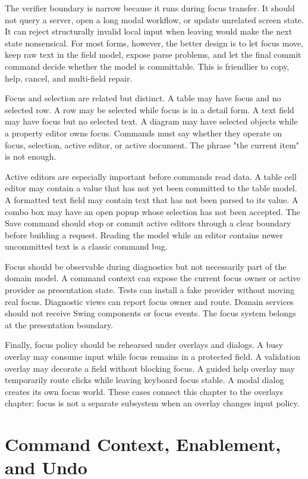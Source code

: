 The verifier boundary is narrow because it runs during focus transfer. It
should not query a server, open a long modal workflow, or update unrelated
screen state. It can reject structurally invalid local input when leaving would
make the next state nonsensical. For most forms, however, the better design is
to let focus move, keep raw text in the field model, expose parse problems, and
let the final commit command decide whether the model is committable. This is
friendlier to copy, help, cancel, and multi-field repair.

Focus and selection are related but distinct. A table may have focus and no
selected row. A row may be selected while focus is in a detail form. A text
field may have focus but no selected text. A diagram may have selected objects
while a property editor owns focus. Commands must say whether they operate on
focus, selection, active editor, or active document. The phrase "the current
item" is not enough.

Active editors are especially important before commands read data. A table cell
editor may contain a value that has not yet been committed to the table model.
A formatted text field may contain text that has not been parsed to its value.
A combo box may have an open popup whose selection has not been accepted. The
Save command should stop or commit active editors through a clear boundary
before building a request. Reading the model while an editor contains newer
uncommitted text is a classic command bug.

Focus should be observable during diagnostics but not necessarily part of the
domain model. A command context can expose the current focus owner or active
provider as presentation state. Tests can install a fake provider without
moving real focus. Diagnostic views can report focus owner and route. Domain
services should not receive Swing components or focus events. The focus system
belongs at the presentation boundary.

Finally, focus policy should be rehearsed under overlays and dialogs. A busy
overlay may consume input while focus remains in a protected field. A validation
overlay may decorate a field without blocking focus. A guided help overlay may
temporarily route clicks while leaving keyboard focus stable. A modal dialog
creates its own focus world. These cases connect this chapter to the overlays
chapter: focus is not a separate subsystem when an overlay changes input
policy.

\section{Command Context, Enablement, and Undo}

